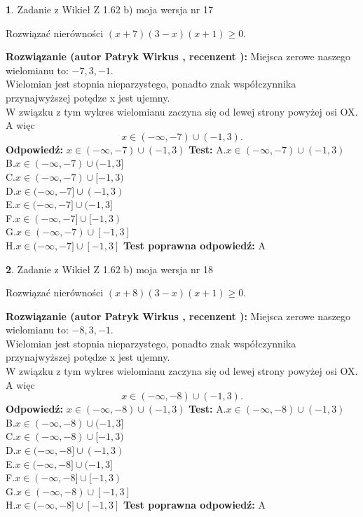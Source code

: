 \documentclass[12pt, a4paper]{article}
\theoremstyle{definition} %
\newtheorem{zad}{}
\newcommand{\zadStart}[1]{\begin{zad}#1\newline}
\newcommand{\zadStop}{\end{zad}}
\newcommand{\rozwStart}[2]{\noindent \textbf{Rozwiązanie (autor #1 , recenzent #2): }\newline}
\newcommand{\rozwStop}{\newline}
\newcommand{\odpStart}{\noindent \textbf{Odpowiedź:}\newline}
\newcommand{\odpStop}{\newline}
\newcommand{\testStart}{\noindent \textbf{Test:}\newline}
\newcommand{\testStop}{\newline}
\newcommand{\kluczStart}{\noindent \textbf{Test poprawna odpowiedź:}\newline}
\newcommand{\kluczStop}{\newline}
\begin{document}
\zadStart{Zadanie z Wikieł Z 1.62 b) moja wersja nr 17}

Rozwiązać nierówności $(x+7)(3-x)(x+1)\ge0$.
\zadStop
\rozwStart{Patryk Wirkus}{}
Miejsca zerowe naszego wielomianu to: $-7, 3, -1$.\\
Wielomian jest stopnia nieparzystego, ponadto znak współczynnika przy\linebreak najwyższej potędze x jest ujemny.\\ W związku z tym wykres wielomianu zaczyna się od lewej strony powyżej osi OX. A więc $$x \in (-\infty,-7) \cup (-1,3).$$
\rozwStop
\odpStart
$x \in (-\infty,-7) \cup (-1,3)$
\odpStop
\testStart
A.$x \in (-\infty,-7) \cup (-1,3)$\\
B.$x \in (-\infty,-7) \cup (-1,3]$\\
C.$x \in (-\infty,-7) \cup [-1,3)$\\
D.$x \in (-\infty,-7] \cup (-1,3)$\\
E.$x \in (-\infty,-7] \cup (-1,3]$\\
F.$x \in (-\infty,-7] \cup [-1,3)$\\
G.$x \in (-\infty,-7) \cup [-1,3]$\\
H.$x \in (-\infty,-7] \cup [-1,3]$
\testStop
\kluczStart
A
\kluczStop



\zadStart{Zadanie z Wikieł Z 1.62 b) moja wersja nr 18}

Rozwiązać nierówności $(x+8)(3-x)(x+1)\ge0$.
\zadStop
\rozwStart{Patryk Wirkus}{}
Miejsca zerowe naszego wielomianu to: $-8, 3, -1$.\\
Wielomian jest stopnia nieparzystego, ponadto znak współczynnika przy\linebreak najwyższej potędze x jest ujemny.\\ W związku z tym wykres wielomianu zaczyna się od lewej strony powyżej osi OX. A więc $$x \in (-\infty,-8) \cup (-1,3).$$
\rozwStop
\odpStart
$x \in (-\infty,-8) \cup (-1,3)$
\odpStop
\testStart
A.$x \in (-\infty,-8) \cup (-1,3)$\\
B.$x \in (-\infty,-8) \cup (-1,3]$\\
C.$x \in (-\infty,-8) \cup [-1,3)$\\
D.$x \in (-\infty,-8] \cup (-1,3)$\\
E.$x \in (-\infty,-8] \cup (-1,3]$\\
F.$x \in (-\infty,-8] \cup [-1,3)$\\
G.$x \in (-\infty,-8) \cup [-1,3]$\\
H.$x \in (-\infty,-8] \cup [-1,3]$
\testStop
\kluczStart
A
\kluczStop
\end{document}
